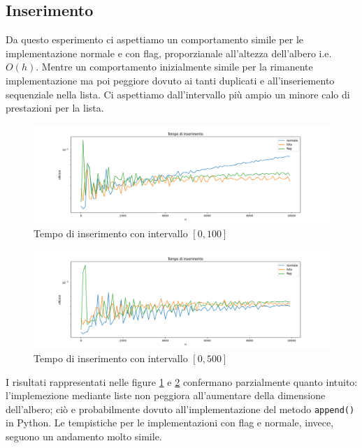 \documentclass{article}
\begin{document}
\subsection{Inserimento}
Da questo esperimento ci aspettiamo un comportamento simile per le implementazione normale e con flag, proporzianale all'altezza dell'albero i.e. \( O(h) \). Mentre un comportamento inizialmente simile per la rimanente implementazione ma poi peggiore dovuto ai tanti duplicati e all'inseriemento sequenziale nella lista. Ci aspettiamo dall'intervallo più ampio un minore calo di prestazioni per la lista.
\begin{figure}[H]
\centering
  \centering
  \includegraphics[width=\linewidth]{img/insert_graph_100_log.png}
  \caption{Tempo di inserimento con intervallo  \( [0, 100] \) }
  \label{insert100}
\end{figure}
\begin{figure}[H]
\centering
  \centering
  \includegraphics[width=\linewidth]{img/insert_graph_500_log.png}
  \caption{Tempo di inserimento con intervallo \( [0, 500] \) }
  \label{insert500}
\end{figure}
I risultati rappresentati nelle figure \ref{insert100} e \ref{insert500} confermano parzialmente quanto intuito: l'implemezione mediante liste non peggiora all'aumentare della dimensione dell'albero; ciò e probabilmente dovuto all'implementazione del metodo \verb|append()| in Python. 
Le tempistiche per le implementazioni con flag e normale, invece, seguono un andamento molto simile.
\end{document}
